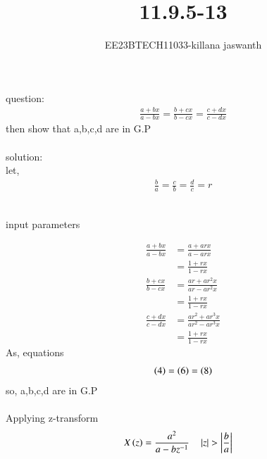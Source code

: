 \documentclass[journal,12pt,twocolumn]{IEEEtran}
\theoremstyle{remark}
\begin{document}

\vspace{3cm}

\title{11.9.5-13}
\author{EE23BTECH11033-killana jaswanth}
\maketitle
\newpage

\bigskip

\renewcommand{\thefigure}{\theenumi}
\renewcommand{\thetable}{\theenumi}
question:\begin{align}
\frac{a+bx}{a-bx}=\frac{b+cx}{b-cx}=\frac{c+dx}{c-dx}
\end{align}
then show that a,b,c,d are in G.P\\\\
solution:\\
      let,
\begin{align}
\frac{b}{a}=\frac{c}{b}=\frac{d}{c}=r
\end{align}
\\\begin{table}[!ht]
 \centering
  
   \caption{input parameters}
   \label{tab:11.9.5.13}
   \end{table}
\begin{align}
\frac{a+bx}{a-bx}&=\frac{a+arx}{a-arx}\\
&=\frac{1+rx}{1-rx}\\
\frac{b+cx}{b-cx}&=\frac{ar+ar^2x}{ar-ar^2x}\\
&=\frac{1+rx}{1-rx}\\
\frac{c+dx}{c-dx}&=\frac{ar^2+ar^3x}{ar^2-ar^3x}\\
&=\frac{1+rx}{1-rx}
\end{align}
As, equations\begin{align} \left(4\right)=\left(6\right)=\left(8\right)
\end{align}
so, a,b,c,d are in G.P\\\\
Applying z-transform\\
\begin{align}
X\left(z\right)&=\frac{a^2}{a-bz^{-1}} \quad \left\vert z\right\vert>\left\vert\frac{b}{a}\right\vert
\end{align}
\end{document}
